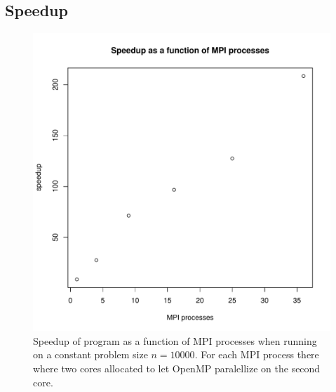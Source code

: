 \documentclass{article}
\begin{document}
\subsection{Speedup}
\begin{figure}[H]
  \begin{center}
    \includegraphics[width=12cm]{../analysis/mpi_nodes_speedup.pdf}
  \end{center}
  \caption{Speedup of program as a function of MPI processes when running on a constant problem size $n=10000$. For each MPI process there where two cores allocated to let OpenMP paralellize on the second core.}
  \label{mpi_nodes_speedup}
\end{figure}
\end{document}
